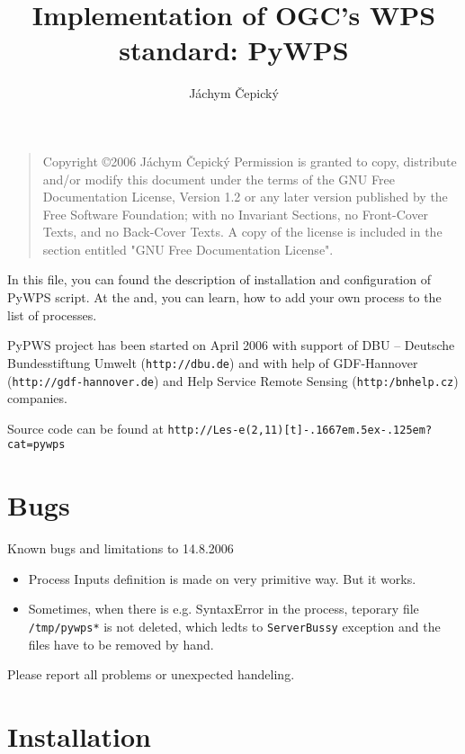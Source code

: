 \documentclass[a4paper,11pt]{article}
\author{Jáchym Čepický}
\title{Implementation of OGC's WPS standard: PyWPS}
\makeatletter
\def\Lesejk{{\tt{}Les-e\makebox(2,11)[t]{\rotatebox{35}{j}}\kern-.1667em\lower.5ex\hbox{\rotatebox{315}{k}}\kern-.125em\@}}
\makeatother
\begin{document}
\maketitle{}

\bigskip
\begin{quote}
    Copyright \copyright  2006 Jáchym Čepický
    Permission is granted to copy, distribute and/or modify this document
    under the terms of the GNU Free Documentation License, Version 1.2
    or any later version published by the Free Software Foundation;
    with no Invariant Sections, no Front-Cover Texts, and no Back-Cover Texts.
    A copy of the license is included in the section entitled "GNU
    Free Documentation License".
\end{quote}
\bigskip
    

    In this file, you can found the description of installation and
    configuration of PyWPS script. At the and, you can learn, how to add
    your own process to the list of processes. 

    PyPWS project has been started on April 2006 with support of DBU -- Deutsche Bundesstiftung Umwelt (\texttt{http://dbu.de}) and with help of GDF-Hannover (\texttt{http://gdf-hannover.de}) and Help Service Remote Sensing (\texttt{http:/bnhelp.cz}) companies.
     
    Source code can be found at \texttt{http://}\Lesejk\texttt{?cat=pywps}
     \tableofcontents

    \newpage
     
    \section{Bugs}
    Known bugs and limitations to 14.8.2006
    \begin{itemize}
    \item  Process Inputs definition is made on very primitive way. But it works.
    \item Sometimes, when there is e.g. SyntaxError in the process, teporary file \texttt{/tmp/pywps*} is not deleted, which ledts to \texttt{ServerBussy} exception and the files have to be removed by hand.
    \end{itemize}

    Please report all problems or unexpected handeling.

    \section{Installation}
     
\end{document}
